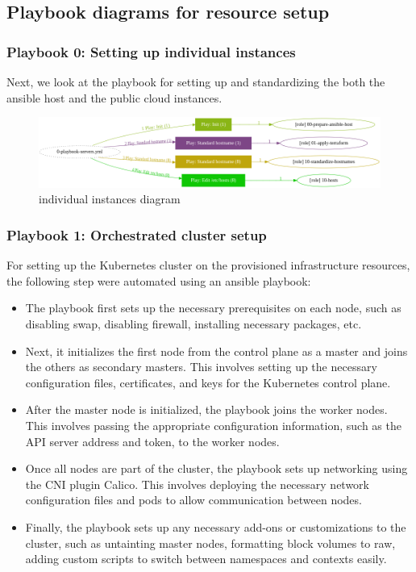 \subsection{Playbook diagrams for resource setup}

\subsubsection{Playbook 0: Setting up individual instances}

Next, we look at the playbook for setting up and standardizing the both the ansible host and the public cloud instances.

\begin{figure}[H]\centering
\includegraphics[width=1.0\textwidth,angle=00]{assets/f17.png}
\caption{individual instances diagram}
\label{fig:individual instances diagram}
\end{figure}

\subsubsection{Playbook 1: Orchestrated cluster setup}

For setting up the Kubernetes cluster on the provisioned infrastructure resources, the following step were automated using an ansible playbook:

\begin{itemize}[label={--}]
    \item The playbook first sets up the necessary prerequisites on each node, such as disabling swap, disabling firewall, installing necessary packages, etc.
    \item Next, it initializes the first node from the control plane as a master and joins the others as secondary masters. This involves setting up the necessary configuration files, certificates, and keys for the Kubernetes control plane.
    \item After the master node is initialized, the playbook joins the worker nodes. This involves passing the appropriate configuration information, such as the API server address and token, to the worker nodes.
    \item Once all nodes are part of the cluster, the playbook sets up networking using the CNI plugin Calico. This involves deploying the necessary network configuration files and pods to allow communication between nodes.
    \item Finally, the playbook sets up any necessary add-ons or customizations to the cluster, such as untainting master nodes, formatting block volumes to raw, adding custom scripts to switch between namespaces and contexts easily.
\end{itemize}

